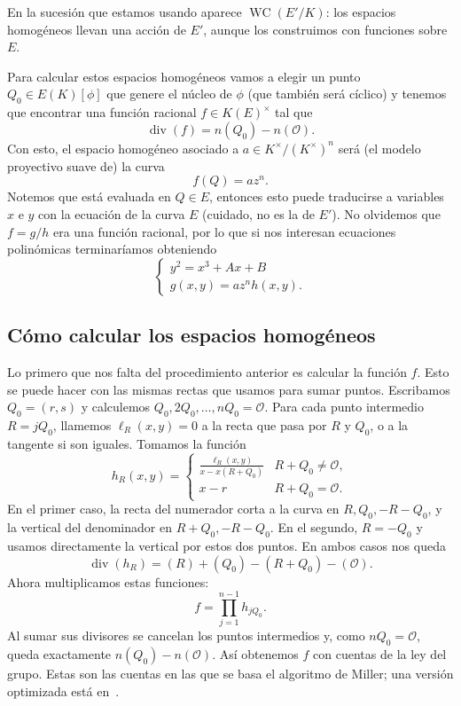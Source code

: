\documentclass[a4paper]{book}
\theoremstyle{definition}
\theoremstyle{plain}
\newcommand{\OO}{\mathcal{O}}
\newcommand{\KmodN}{K^\times/{(K^\times)}^n}
\begin{document}
En la sucesión que estamos usando aparece $\operatorname{WC}(E'/K)$: los espacios homogéneos llevan una acción de $E'$, aunque los construimos con funciones sobre $E$.

Para calcular estos espacios homogéneos vamos a elegir un punto $Q_0\in E(K)[\phi]$ que genere el núcleo de $\phi$ (que también será cíclico) y tenemos que encontrar una función racional $f \in {K(E)}^\times$ tal que 
\[
\operatorname{div}(f) = n(Q_0) - n(\OO).
\]
Con esto, el espacio homogéneo asociado a $a\in\KmodN$ será (el modelo proyectivo suave de) la curva
\[
f(Q) = az^n.
\]
Notemos que está evaluada en $Q \in E$, entonces esto puede traducirse a variables $x$ e $y$ con la ecuación de la curva $E$ (cuidado, no es la de $E'$). No olvidemos que $f=g/h$ era una función racional, por lo que si nos interesan ecuaciones polinómicas terminaríamos obteniendo
\[
\begin{cases}
y^2 = x^3 +Ax + B  \\
g(x,y)=az^n h(x,y).
\end{cases}
\]

\subsection{Cómo calcular los espacios homogéneos}

Lo primero que nos falta del procedimiento anterior es calcular la función $f$. Esto se puede hacer con las mismas rectas que usamos para sumar puntos. Escribamos $Q_0=(r,s)$ y calculemos $Q_0,2Q_0,\ldots,nQ_0=\OO$. Para cada punto intermedio $R=jQ_0$, llamemos $\ell_R(x,y)=0$ a la recta que pasa por $R$ y $Q_0$, o a la tangente si son iguales. Tomamos la función
\[
h_R(x,y)=
\begin{cases}
\displaystyle\frac{\ell_R(x,y)}{x-x(R+Q_0)} & R+Q_0\neq\OO,\\[6pt]
x-r & R+Q_0=\OO.
\end{cases}
\]
En el primer caso, la recta del numerador corta a la curva en $R,Q_0,-R-Q_0$, y la vertical del denominador en $R+Q_0,-R-Q_0$. En el segundo, $R=-Q_0$ y usamos directamente la vertical por estos dos puntos. En ambos casos nos queda
\[
\operatorname{div}(h_R)=(R)+(Q_0)-(R+Q_0)-(\OO).
\]
Ahora multiplicamos estas funciones:
\[
f=\prod_{j=1}^{n-1}h_{jQ_0}.
\]
Al sumar sus divisores se cancelan los puntos intermedios y, como $nQ_0=\OO$, queda exactamente $n(Q_0)-n(\OO)$. Así obtenemos $f$ con cuentas de la ley del grupo. Estas son las cuentas en las que se basa el algoritmo de Miller; una versión optimizada está en~\cite[cap.~XI, teorema~8.1]{SilvermanAEC}.
\end{document}
